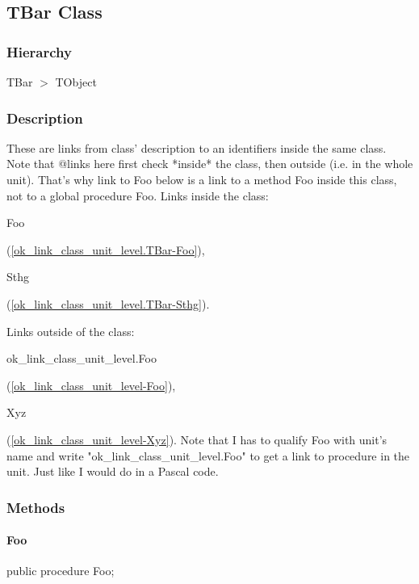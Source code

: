 \documentclass{report}
\begin{document}
\subsection*{TBar Class}
\subsubsection*{\large{\textbf{Hierarchy}}\normalsize\hspace{1ex}\hfill}
TBar {$>$} TObject
\subsubsection*{\large{\textbf{Description}}\normalsize\hspace{1ex}\hfill}
These are links from class' description to an identifiers inside the same class. Note that @links here first check *inside* the class, then outside (i.e. in the whole unit). That's why link to Foo below is a link to a method Foo inside this class, not to a global procedure Foo. Links inside the class: \begin{ttfamily}Foo\end{ttfamily}(\ref{ok_link_class_unit_level.TBar-Foo}), \begin{ttfamily}Sthg\end{ttfamily}(\ref{ok_link_class_unit_level.TBar-Sthg}).

Links outside of the class: \begin{ttfamily}ok{\_}link{\_}class{\_}unit{\_}level.Foo\end{ttfamily}(\ref{ok_link_class_unit_level-Foo}), \begin{ttfamily}Xyz\end{ttfamily}(\ref{ok_link_class_unit_level-Xyz}). Note that I has to qualify Foo with unit's name and write "ok{\_}link{\_}class{\_}unit{\_}level.Foo" to get a link to procedure in the unit. Just like I would do in a Pascal code.\subsubsection*{\large{\textbf{Methods}}\normalsize\hspace{1ex}\hfill}
\paragraph*{Foo}\hspace*{\fill}

\begin{list}{}{
\setlength{\itemindent}{0cm}
\setlength{\listparindent}{0cm}
\setlength{\leftmargin}{\evensidemargin}
\addtolength{\leftmargin}{\tmplength}
\settowidth{\labelsep}{X}
\addtolength{\leftmargin}{\labelsep}
\setlength{\labelwidth}{\tmplength}
}
\begin{flushleft}
\item[\textbf{Declaration}\hfill]
\begin{ttfamily}
public procedure Foo;\end{ttfamily}


\end{flushleft}
\end{list}
\end{document}
